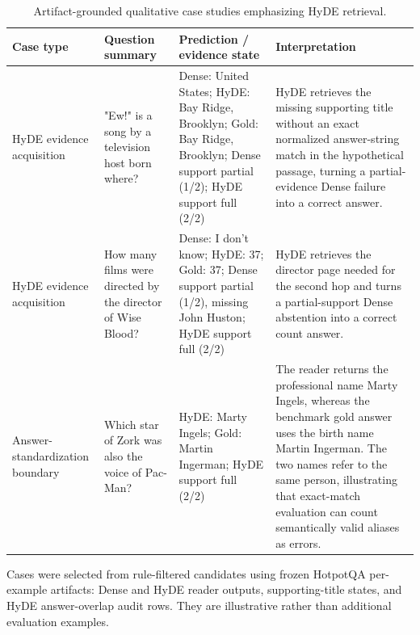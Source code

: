 \begin{table}[t]
\centering
\caption{Artifact-grounded qualitative case studies emphasizing HyDE retrieval.}
\label{tab:qualitative_cases}
\scriptsize
\begin{threeparttable}
\setlength{\tabcolsep}{3pt}
\begin{tabularx}{\textwidth}{>{\raggedright\arraybackslash}p{}
                            >{\raggedright\arraybackslash}p{}
                            >{\raggedright\arraybackslash}p{}
                            >{\raggedright\arraybackslash}X}
\toprule
Case type & Question summary & Prediction / evidence state & Interpretation \\
\midrule
HyDE evidence acquisition & "Ew!" is a song by a television host born where? & Dense: United States; HyDE: Bay Ridge, Brooklyn; Gold: Bay Ridge, Brooklyn; Dense support partial (1/2); HyDE support full (2/2) & HyDE retrieves the missing supporting title without an exact normalized answer-string match in the hypothetical passage, turning a partial-evidence Dense failure into a correct answer. \\
HyDE evidence acquisition & How many films were directed by the director of Wise Blood? & Dense: I don't know; HyDE: 37; Gold: 37; Dense support partial (1/2), missing John Huston; HyDE support full (2/2) & HyDE retrieves the director page needed for the second hop and turns a partial-support Dense abstention into a correct count answer. \\
Answer-standardization boundary & Which star of Zork was also the voice of Pac-Man? & HyDE: Marty Ingels; Gold: Martin Ingerman; HyDE support full (2/2) & The reader returns the professional name Marty Ingels, whereas the benchmark gold answer uses the birth name Martin Ingerman. The two names refer to the same person, illustrating that exact-match evaluation can count semantically valid aliases as errors. \\
\bottomrule
\end{tabularx}
\begin{tablenotes}
\footnotesize
\item Cases were selected from rule-filtered candidates using frozen HotpotQA per-example artifacts: Dense and HyDE reader outputs, supporting-title states, and HyDE answer-overlap audit rows. They are illustrative rather than additional evaluation examples.
\end{tablenotes}
\end{threeparttable}
\end{table}
